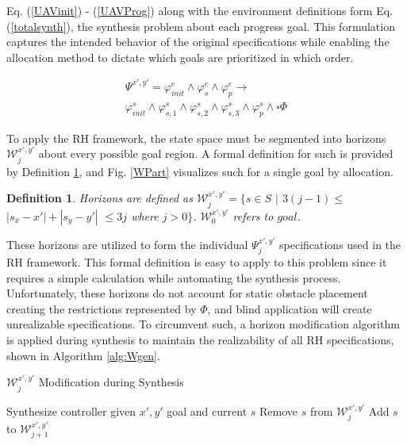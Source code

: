 \documentclass{ieeeaccess}
\newcommand{\always}{\square}
\newtheorem{definition}{Definition}
\begin{document}
Eq. (\ref{UAVinit}) - (\ref{UAVProg}) along with the environment definitions form Eq. (\ref{totalsynth}), the synthesis problem about each progress goal. This formulation captures the intended behavior of the original specifications while enabling the allocation method to dictate which goals are prioritized in which order. 

\begin{equation}
\label{totalsynth}
\begin{aligned}
\Psi^{x',y'} = \varphi^e_{init} \land \varphi^e_s \land \varphi^e_p \longrightarrow \\ \varphi^s_{init} \land \varphi^s_{s,1} \land \varphi^s_{s,2} \land \varphi^s_{s,3} \land \varphi^s_p \land \always \Phi
\end{aligned}
\end{equation}

To apply the RH framework, the state space must be segmented into horizons $\mathcal{W}_j^{x',y'}$ about every possible goal region. A formal definition for such is provided by Definition \ref{definition6}, and Fig. \ref{WPart} visualizes such for a single goal by allocation.

\begin{definition}
	\label{definition6}
	Horizons are defined as $\mathcal{W}^{x',y'}_j = \{s \in S$ $|$ $3(j-1)\le$ $|s_x - x'| + |s_y - y'|$ $ \le 3j$ where $j > 0\}$. $\mathcal{W}^{x',y'}_0$ refers to $goal$.
\end{definition}

These horizons are utilized to form the individual $\Psi^{x',y'}_j$ specifications used in the RH framework. This formal definition is easy to apply to this problem since it requires a simple calculation while automating the synthesis process. Unfortunately, these horizons do not account for static obstacle placement creating the restrictions represented by $\Phi$, and blind application will create unrealizable specifications. To circumvent such, a horizon modification algorithm is applied during synthesis to maintain the realizability of all RH specifications, shown in Algorithm \ref{alg:Wgen}.

\begin{algorithm}
	\caption{$\mathcal{W}^{x',y'}_j$ Modification during Synthesis}\label{alg:Wgen}
	\begin{algorithmic}[1]
		\State Synthesize controller given $x',y'$ goal and current $s$
		\State Remove $s$ from $\mathcal{W}_j^{x',y'}$
		\State Add $s$ to $\mathcal{W}_{j+1}^{x',y'}$
		\EndIf
		\EndFor
		\EndFor
		\EndProcedure
	\end{algorithmic}
\end{algorithm}	
\end{document}
